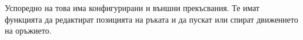 

Успоредно на това има конфигурирани и външни прекъсвания. Те имат функцията да редактират позицията на ръката и да пускат или спират движението на оръжието.


